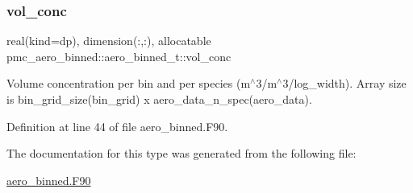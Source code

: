 \subsubsection{\texorpdfstring{vol\+\_\+conc}{vol\_conc}}
{\footnotesize\ttfamily real(kind=dp), dimension(\+:,\+:), allocatable pmc\+\_\+aero\+\_\+binned\+::aero\+\_\+binned\+\_\+t\+::vol\+\_\+conc}



Volume concentration per bin and per species (m$^\wedge$3/m$^\wedge$3/log\+\_\+width). Array size is {\ttfamily bin\+\_\+grid\+\_\+size(bin\+\_\+grid) x aero\+\_\+data\+\_\+n\+\_\+spec(aero\+\_\+data)}. 



Definition at line 44 of file aero\+\_\+binned.\+F90.



The documentation for this type was generated from the following file\+:\begin{DoxyCompactItemize}
\item 
\mbox{\hyperlink{aero__binned_8_f90}{aero\+\_\+binned.\+F90}}\end{DoxyCompactItemize}
